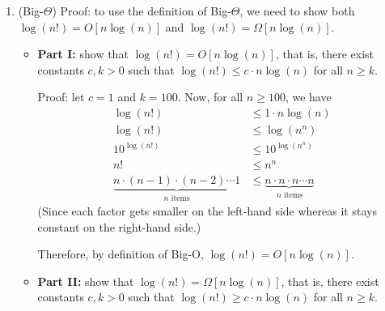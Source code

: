 \documentclass{article}
\begin{document}
\begin{enumerate}

  \item (Big-$\Theta$) Proof: to use the definition of Big-$\Theta$, we need to show both $\log(n!) = O[n\log(n)]$ and $\log(n!) = \Omega[n\log(n)]$.

    \begin{itemize}
      \item \textbf{Part I:} show that $\log(n!) = O[n\log(n)]$, that is, there exist constants $c, k > 0$ such that $\log(n!) \le c \cdot n\log(n)$ for all $n \ge k$.

        Proof: let $c = 1$ and $k = 100$. Now, for all $n \ge 100$, we have
        \begin{displaymath}
          \begin{aligned}
            \log(n!)      & \le 1 \cdot n\log(n)                                        \\
            \log(n!)      & \le \log(n^n)                                               \\
            10^{\log(n!)} & \le 10^{\log(n^n)}                                          \\
            n!            & \le n^n                                                     \\
            \underbrace{n \cdot (n-1) \cdot (n-2) \cdots 1}_{n\text{ items}}
                          & \le \underbrace{n \cdot n \cdot n\cdots n}_{n\text{ items}}
          \end{aligned}
        \end{displaymath}
        (Since each factor gets smaller on the left-hand side whereas it stays constant on the right-hand side.)

        Therefore, by definition of Big-O, $\log(n!) = O[n\log(n)]$.

      \item \textbf{Part II:} show that $\log(n!) = \Omega[n\log(n)]$, that is, there exist constants $c, k > 0$ such that $\log(n!) \ge c \cdot n\log(n)$ for all $n \ge k$.


\end{itemize}
\end{enumerate}
\end{document}
